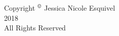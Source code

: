 \documentclass[hyperpdf,oneside,bindnopdf,usenames,dvipsnames,svgnames,table,longbibliography]{hepthesis}
\begin{document}
\begin{frontmatter}
\begin{center}
\end{center}
\thispagestyle{empty}
\let\cleardoublepage\clearpage

\vspace*{8cm}
\begin{center}
    Copyright $\textsuperscript{\textcopyright}$ Jessica Nicole Esquivel\\
    2018\\
    All Rights Reserved\\
\end{center}
\thispagestyle{empty}
\let\cleardoublepage\clearpage

% 
  
\end{frontmatter}

\begin{mainmatter}
  
  
  
  
  
  
  
  
  
\end{mainmatter}


\begin{backmatter}
  
\end{backmatter}




\renewcommand{\appendixname}{Curriculum Vitae}
\begin{appendices}
  
\end{appendices}
%  

\end{document}
